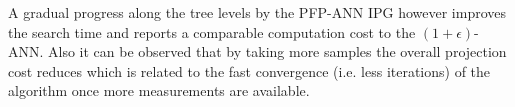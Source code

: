   A gradual progress along the tree levels by the PFP-ANN IPG however improves the search time and reports a comparable computation cost to the $(1+\epsilon)$-ANN. 
Also it can be observed that by taking more samples the overall projection cost reduces which is related to the fast convergence (i.e. less iterations) of the algorithm once more measurements are available.
  





%
%


